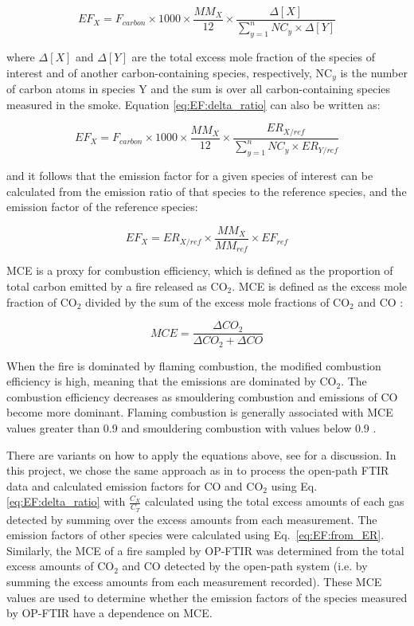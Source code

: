 \documentclass[acp, manuscript]{copernicus}
\begin{document}
\begin{equation} \label{eq:EF:delta_ratio}
EF_X = F_{carbon} \times 1000 \times \frac{MM_X}{12} \times \frac{\Delta[X]}{\sum_{y=1}^{n} NC_y \times \Delta[Y]}
\end{equation}

where $\Delta[X]$ and $\Delta[Y]$ are the total excess mole fraction of the species of interest and of another carbon-containing species, respectively, NC$_y$ is the number of carbon atoms in species Y and the sum is over all carbon-containing species measured in the smoke. 
Equation \ref{eq:EF:delta_ratio} can also be written as:

\begin{equation}
EF_X = F_{carbon} \times 1000 \times \frac{MM_X}{12} \times \frac{ER_{X/ref}}{\sum_{y=1}^{n} NC_y \times ER_{Y/ref}}
\end{equation}

and it follows that the emission factor for a given species of interest can be calculated from the emission ratio of that species to the reference species, and the emission factor of the reference species:

\begin{equation} \label{eq:EF:from_ER}
EF_X = ER_{X/ref} \times \frac{MM_X}{MM_{ref}} \times EF_{ref}
\end{equation}

MCE is a proxy for combustion efficiency, which is defined as the proportion of total carbon emitted by a fire released as CO$_2$. MCE is defined as the excess mole fraction of CO$_2$ divided by the sum of the excess mole fractions of CO$_2$ and CO \citep{Hao1993,Yokelson1996}:

\begin{equation} \label{eq:MCE}
MCE = \frac{\Delta CO_2}{\Delta CO_2 + \Delta CO}
\end{equation}
 
When the fire is dominated by flaming combustion, the modified combustion efficiency is high, meaning that the emissions are dominated by CO$_2$. The combustion efficiency decreases as smouldering combustion and emissions of CO become more dominant. Flaming combustion is generally associated with MCE values greater than 0.9 and smouldering combustion with values below 0.9 \citep{Yokelson1996, Bertschi2003}.

There are variants on how to apply the equations above, see \citet{Paton-Walsh2014} for a discussion. In this project, we chose the same approach as in \citet{Paton-Walsh2014} to process the open-path FTIR data and calculated emission factors for CO and CO$_2$ using Eq. \ref{eq:EF:delta_ratio} with $ \frac{C_X}{C_T} $ calculated using the total excess amounts of each gas detected by summing over the excess amounts from each measurement. The emission factors of other species were calculated using Eq.~\ref{eq:EF:from_ER}.
Similarly, the MCE of a fire sampled by OP-FTIR was determined from the total excess amounts of CO$_2$ and CO detected by the open-path system (i.e. by summing the excess amounts from each measurement recorded). These MCE values are used to determine whether the emission factors of the species measured by OP-FTIR have a dependence on MCE. 
\end{document}
